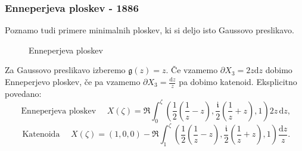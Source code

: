 \documentclass[8pt]{beamer}
\newcommand{\samplescalar}{5}  %
\theoremstyle{definition}
\theoremstyle{remark}
\theoremstyle{plain}
\numberwithin{equation}{section}  %
\begin{document}
\begin{frame}
    \frametitle{Enneperjeva ploskev - 1886}

    Poznamo tudi primere minimalnih ploskev, ki si deljo isto Gaussovo preslikavo. 

    \begin{figure}[H]
        \centering

        \caption{Enneperjeva ploskev}
    \end{figure}

    Za Gaussovo preslikavo izberemo $\mathfrak{g}(z)=z$. Če vzamemo $\partial X_3=2 z \mathrm{d} z$ dobimo Enneperjevo ploskev, če pa vzamemo $\partial X_3=\frac{\mathrm{d} z}{z}$ pa dobimo katenoid. Eksplicitno povedano: 
    \begin{equation*}
        \text { Enneperjeva ploskev } \quad X(\zeta)=\Re \int_0^\zeta\left(\frac{1}{2}\left(\frac{1}{z}-z\right), \frac{\mathfrak{i}}{2}\left(\frac{1}{z}+z\right), 1\right) 2 z \, \mathrm{d} z,
    \end{equation*}  
    \begin{equation*}
        \text { Katenoida } \quad X(\zeta)=(1,0,0)-\Re \int_1^\zeta\left(\frac{1}{2}\left(\frac{1}{z} - z\right), \frac{\mathfrak{i}}{2}\left(\frac{1}{z}+z\right), 1\right) \frac{\mathrm{d} z}{z} .
    \end{equation*}
\end{frame}
\end{document}
